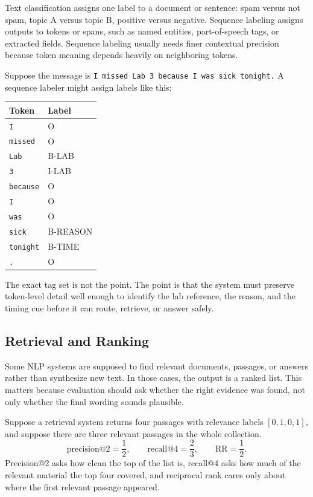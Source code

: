 Text classification assigns one label to a document or sentence: spam versus not spam, topic A versus topic B, positive versus negative. Sequence labeling assigns outputs to tokens or spans, such as named entities, part-of-speech tags, or extracted fields. Sequence labeling usually needs finer contextual precision because token meaning depends heavily on neighboring tokens.

\begin{example}
Suppose the message is \texttt{I missed Lab 3 because I was sick tonight.}
A sequence labeler might assign labels like this:
\begin{center}
\begin{tabular}{@{}ll@{}}
\toprule
Token & Label \\
\midrule
\texttt{I} & O \\
\texttt{missed} & O \\
\texttt{Lab} & B-LAB \\
\texttt{3} & I-LAB \\
\texttt{because} & O \\
\texttt{I} & O \\
\texttt{was} & O \\
\texttt{sick} & B-REASON \\
\texttt{tonight} & B-TIME \\
\texttt{.} & O \\
\bottomrule
\end{tabular}
\end{center}
The exact tag set is not the point. The point is that the system must preserve token-level detail well enough to identify the lab reference, the reason, and the timing cue before it can route, retrieve, or answer safely.
\end{example}

\subsection{Retrieval and Ranking}

Some NLP systems are supposed to find relevant documents, passages, or answers rather than synthesize new text. In those cases, the output is a ranked list. This matters because evaluation should ask whether the right evidence was found, not only whether the final wording sounds plausible.

\begin{mathlens}
Suppose a retrieval system returns four passages with relevance labels \([0,1,0,1]\), and suppose there are three relevant passages in the whole collection.
\[
\mathrm{precision@2}=\frac{1}{2}, \qquad \mathrm{recall@4}=\frac{2}{3}, \qquad \mathrm{RR}=\frac{1}{2}.
\]
Precision@2 asks how clean the top of the list is, recall@4 asks how much of the relevant material the top four covered, and reciprocal rank cares only about where the first relevant passage appeared.
\end{mathlens}

